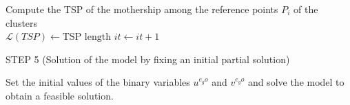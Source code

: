 \begin{algorithm}
\begin{algorithmic}
\State Compute the TSP of the mothership among the reference points $P_i$ of the clusters\\
\State $\mathcal L(TSP) \gets \mbox{TSP length}$
\State $it \gets it+1$\\
\end{algorithmic}
STEP 5 (Solution of the \AMD\xspace model by fixing an initial partial solution)
\begin{algorithmic}
\State Set the initial values of the binary variables $u^{e_{g}o}$ and $v^{e_{g}o}$ and solve the model \AMD\xspace to obtain a feasible solution.
\end{algorithmic}
\end{algorithm}

